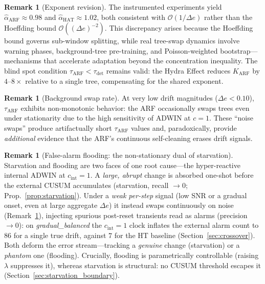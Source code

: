 \documentclass[10pt,conference]{IEEEtran}
\theoremstyle{definition}
\newtheorem{remark}[theorem]{Remark}
\begin{document}
\begin{remark}[Exponent revision]\label{rem:exponent}
  The instrumented experiments yield $\hat\alpha_{\mathrm{ARF}} \approx 0.98$ and $\hat\alpha_{\mathrm{HAT}} \approx 1.02$, both consistent with $\mathcal{O}(1/\Delta e)$ rather than the Hoeffding bound $\mathcal{O}((\Delta e)^{-2})$.
  This discrepancy arises because the Hoeffding bound governs sub-window splitting, while real tree-swap dynamics involve warning phases, background-tree pre-training, and Poisson-weighted bootstrap---mechanisms that accelerate adaptation beyond the concentration inequality.
  The blind spot condition $\tau_{\mathrm{ARF}} < \tau_{\mathrm{det}}$ remains valid: the Hydra Effect reduces $K_{\mathrm{ARF}}$ by $4$--$8\times$ relative to a single tree, compensating for the shared exponent.
\end{remark}

\begin{remark}[Background swap rate]\label{rem:bgswap}
  At very low drift magnitudes ($\Delta e < 0.10$), $\tau_{\mathrm{ARF}}$ exhibits non-monotonic behavior: the ARF occasionally swaps trees even under stationarity due to the high sensitivity of ADWIN at $c = 1$.
  These ``noise swaps'' produce artifactually short $\tau_{\mathrm{ARF}}$ values and, paradoxically, provide \emph{additional} evidence that the ARF's continuous self-cleaning erases drift signals.
\end{remark}

\begin{remark}[False-alarm flooding: the non-stationary dual of starvation]\label{rem:flooding}
  Starvation and flooding are two faces of one root cause---the hyper-reactive internal ADWIN at $c_{\mathrm{int}}{=}1$. A \emph{large, abrupt} change is absorbed one-shot before the external CUSUM accumulates (starvation, recall $\to 0$; Prop.~\ref{prop:starvation}). Under a \emph{weak per-step} signal (low SNR or a gradual onset, even at large aggregate $\Delta e$) it instead swaps continuously on noise (Remark~\ref{rem:bgswap}), injecting spurious post-reset transients read as alarms (precision $\to 0$): on \emph{gradual\_balanced} the $c_{\mathrm{int}}{=}1$ clock inflates the external alarm count to $86$ for a single true drift, against $7$ for the HT baseline (Section~\ref{sec:crossover}). Both deform the error stream---tracking a \emph{genuine} change (starvation) or a \emph{phantom} one (flooding). Crucially, flooding is parametrically controllable (raising $\lambda$ suppresses it), whereas starvation is structural: no CUSUM threshold escapes it (Section~\ref{sec:starvation_boundary}).
\end{remark}
\end{document}
